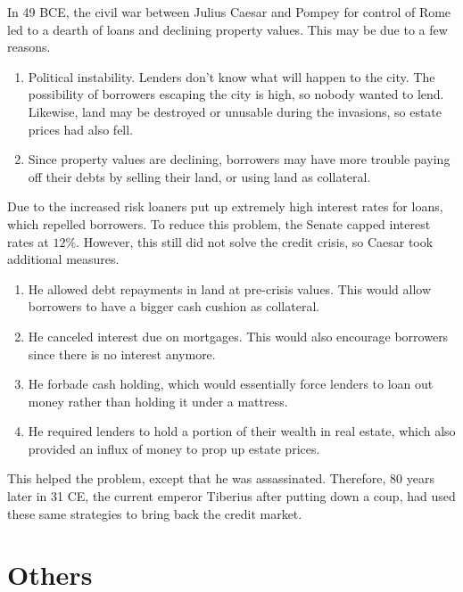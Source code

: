 \documentclass{article}
\begin{document}
    In 49 BCE, the civil war between Julius Caesar and Pompey for control of Rome led to a dearth of loans and declining property values. This may be due to a few reasons. 
    \begin{enumerate}
      \item Political instability. Lenders don't know what will happen to the city. The possibility of borrowers escaping the city is high, so nobody wanted to lend. Likewise, land may be destroyed or unusable during the invasions, so estate prices had also fell. 

      \item Since property values are declining, borrowers may have more trouble paying off their debts by selling their land, or using land as collateral.  
    \end{enumerate}

    Due to the increased risk loaners put up extremely high interest rates for loans, which repelled borrowers. To reduce this problem, the Senate capped interest rates at $12\%$. However, this still did not solve the credit crisis, so Caesar took additional measures. 
    \begin{enumerate}
      \item He allowed debt repayments in land at pre-crisis values. This would allow borrowers to have a bigger cash cushion as collateral. 
      \item He canceled interest due on mortgages. This would also encourage borrowers since there is no interest anymore. 
      \item He forbade cash holding, which would essentially force lenders to loan out money rather than holding it under a mattress. 
      \item He required lenders to hold a portion of their wealth in real estate, which also provided an influx of money to prop up estate prices.  
    \end{enumerate}

    This helped the problem, except that he was assassinated. Therefore, 80 years later in 31 CE, the current emperor Tiberius after putting down a coup, had used these same strategies to bring back the credit market. 

\section{Others}
\end{document}
